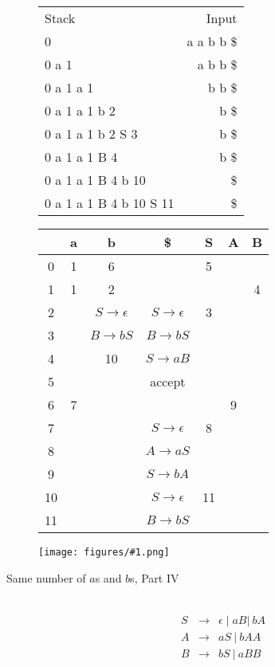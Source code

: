 \documentclass[12pt]{article}
\newcommand{\myfig}[1]{\texttt{[image: figures/\#1.png]}}
\newcommand{\arr}[2]{$#1\rightarrow #2$}
\newcommand{\arrl}[1]{$#1\rightarrow \mt$}
\newcommand{\mt}{\ensuremath{\epsilon}}
\begin{document}
\begin{description}
\begin{tabular}{lr}
Stack & Input \\
0     & a a b b \$\\
0 a 1 & a b b  \$\\
0 a 1 a 1 & b b  \$\\
0 a 1 a 1 b 2 & b  \$\\
0 a 1 a 1 b 2 S 3 & b \$\\
0 a 1 a 1 B 4 & b \$\\
0 a 1 a 1 B 4 b 10 &  \$\\
0 a 1 a 1 B 4 b 10 S 11 &  \$\\
\end{tabular}\hfill
\begin{tabular}{|c|c|c|c|c|c|c|}\hline
  & a & b & \$ & S & A & B \\\hline
0 & 1 & 6 &    & 5  &   &   \\\hline
1 & 1  & 2 &    &   &   &  4 \\\hline
2 &   &\arrl{S}&\arrl{S}& 3  &   &   \\\hline
3 &   &\arr{B}{bS}&\arr{B}{bS} &   &   &   \\\hline
4 &   & 10  &\arr{S}{aB} &   &   &   \\\hline
5 &   &   &  accept   &   &   &   \\\hline
6 & 7 &   &    &   & 9 &   \\\hline
7 &   &   &\arrl{S}& 8  &   &   \\\hline
8 &   &   &\arr{A}{aS} &   &   &   \\\hline
9 &   &   &\arr{S}{bA} &   &   &   \\\hline
10 &   &   &\arrl{S} & 11  &   &   \\\hline
11 &   &   &\arr{B}{bS} &   &   &   \\\hline
\end{tabular}

\vspace{.5in}

\myfig{lrparseexamples07}



\newpage
\item[Same number of $a$s and $b$s, Part IV]\mbox{}\\

\begin{eqnarray*}
S &\rightarrow&  \mt \mid  aB |\ bA\\
A &\rightarrow& aS\ |\ bAA\\
B &\rightarrow& bS\ |\ aBB
\end{eqnarray*}


\end{description}
\end{document}
